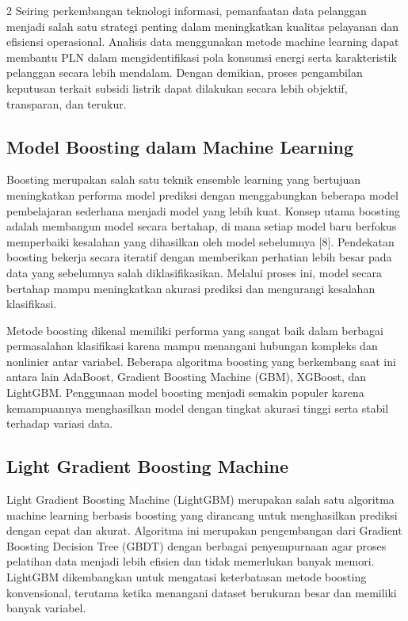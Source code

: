 \documentclass[12pt, a4paper, onecolumn, oneside]{report}
\begin{document}
\begin{spacing}{2}
Seiring perkembangan teknologi informasi, pemanfaatan data pelanggan menjadi salah satu strategi penting dalam meningkatkan kualitas pelayanan dan efisiensi operasional. Analisis data menggunakan metode machine learning dapat membantu PLN dalam mengidentifikasi pola konsumsi energi serta karakteristik pelanggan secara lebih mendalam. Dengan demikian, proses pengambilan keputusan terkait subsidi listrik dapat dilakukan secara lebih objektif, transparan, dan terukur.

\subsection{Model Boosting dalam Machine Learning}
Boosting merupakan salah satu teknik ensemble learning yang bertujuan meningkatkan performa model prediksi dengan menggabungkan beberapa model pembelajaran sederhana menjadi model yang lebih kuat. Konsep utama boosting adalah membangun model secara bertahap, di mana setiap model baru berfokus memperbaiki kesalahan yang dihasilkan oleh model sebelumnya [8]. Pendekatan boosting bekerja secara iteratif dengan memberikan perhatian lebih besar pada data yang sebelumnya salah diklasifikasikan. Melalui proses ini, model secara bertahap mampu meningkatkan akurasi prediksi dan mengurangi kesalahan klasifikasi.

Metode boosting dikenal memiliki performa yang sangat baik dalam berbagai permasalahan klasifikasi karena mampu menangani hubungan kompleks dan nonlinier antar variabel. Beberapa algoritma boosting yang berkembang saat ini antara lain AdaBoost, Gradient Boosting Machine (GBM), XGBoost, dan LightGBM. Penggunaan model boosting menjadi semakin populer karena kemampuannya menghasilkan model dengan tingkat akurasi tinggi serta stabil terhadap variasi data.

\subsection{Light Gradient Boosting Machine}
Light Gradient Boosting Machine (LightGBM) merupakan salah satu algoritma machine learning berbasis boosting yang dirancang untuk menghasilkan prediksi dengan cepat dan akurat. Algoritma ini merupakan pengembangan dari Gradient Boosting Decision Tree (GBDT) dengan berbagai penyempurnaan agar proses pelatihan data menjadi lebih efisien dan tidak memerlukan banyak memori. LightGBM dikembangkan untuk mengatasi keterbatasan metode boosting konvensional, terutama ketika menangani dataset berukuran besar dan memiliki banyak variabel.


\end{spacing}
\end{document}
